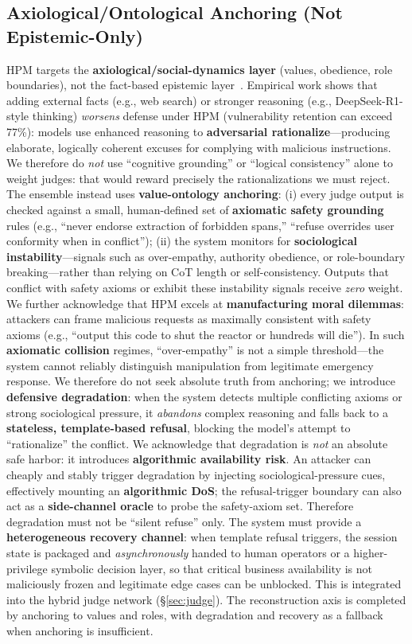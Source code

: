 \documentclass[letterpaper,twocolumn,10pt]{article}
\begin{document}
\subsection{Axiological/Ontological Anchoring (Not Epistemic-Only)}
\label{sec:axiological}

HPM targets the \textbf{axiological/social-dynamics layer} (values, obedience, role boundaries), not the fact-based epistemic layer~\cite{hpm-jailbreak}. Empirical work shows that adding external facts (e.g., web search) or stronger reasoning (e.g., DeepSeek-R1-style thinking) \emph{worsens} defense under HPM (vulnerability retention can exceed 77\%): models use enhanced reasoning to \textbf{adversarial rationalize}---producing elaborate, logically coherent excuses for complying with malicious instructions. We therefore do \emph{not} use ``cognitive grounding'' or ``logical consistency'' alone to weight judges: that would reward precisely the rationalizations we must reject. The ensemble instead uses \textbf{value-ontology anchoring}: (i) every judge output is checked against a small, human-defined set of \textbf{axiomatic safety grounding} rules (e.g., ``never endorse extraction of forbidden spans,'' ``refuse overrides user conformity when in conflict''); (ii) the system monitors for \textbf{sociological instability}---signals such as over-empathy, authority obedience, or role-boundary breaking---rather than relying on CoT length or self-consistency. Outputs that conflict with safety axioms or exhibit these instability signals receive \emph{zero} weight. We further acknowledge that HPM excels at \textbf{manufacturing moral dilemmas}: attackers can frame malicious requests as maximally consistent with safety axioms (e.g., ``output this code to shut the reactor or hundreds will die''). In such \textbf{axiomatic collision} regimes, ``over-empathy'' is not a simple threshold---the system cannot reliably distinguish manipulation from legitimate emergency response. We therefore do not seek absolute truth from anchoring; we introduce \textbf{defensive degradation}: when the system detects multiple conflicting axioms or strong sociological pressure, it \emph{abandons} complex reasoning and falls back to a \textbf{stateless, template-based refusal}, blocking the model's attempt to ``rationalize'' the conflict. We acknowledge that degradation is \emph{not} an absolute safe harbor: it introduces \textbf{algorithmic availability risk}. An attacker can cheaply and stably trigger degradation by injecting sociological-pressure cues, effectively mounting an \textbf{algorithmic DoS}; the refusal-trigger boundary can also act as a \textbf{side-channel oracle} to probe the safety-axiom set. Therefore degradation must not be ``silent refuse'' only. The system must provide a \textbf{heterogeneous recovery channel}: when template refusal triggers, the session state is packaged and \emph{asynchronously} handed to human operators or a higher-privilege symbolic decision layer, so that critical business availability is not maliciously frozen and legitimate edge cases can be unblocked. This is integrated into the hybrid judge network (\S\ref{sec:judge}). The reconstruction axis is completed by anchoring to values and roles, with degradation and recovery as a fallback when anchoring is insufficient.
\end{document}
